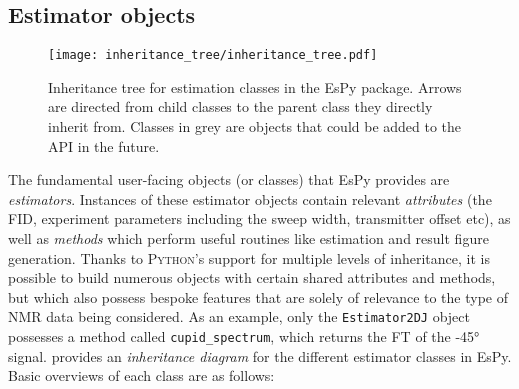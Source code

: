\subsection{Estimator objects}
\begin{figure}
    \centering
    \texttt{[image: inheritance\_tree/inheritance\_tree.pdf]}
    \caption[
        Inheritance tree for estimation classes in the \acs{EsPy} package.
    ]{
        Inheritance tree for estimation classes in the \acs{EsPy} package.
        Arrows are directed from child classes to the parent class they
        directly inherit from. Classes in grey are objects that could be added
        to the \ac{API} in the future.
    }
    \label{fig:inheritance}
\end{figure}
The fundamental user-facing objects (or classes) that \ac{EsPy} provides are
\emph{estimators}.
Instances of these estimator objects contain relevant
\emph{attributes} (the \ac{FID}, experiment parameters including the sweep
width, transmitter offset etc), as well as \emph{methods} which perform useful
routines like estimation and result figure generation.
Thanks to \textsc{Python}'s support for multiple levels of inheritance, it is
possible to build numerous objects with certain shared attributes and methods,
but which also possess bespoke features that are solely of relevance to
the type of \ac{NMR} data being considered. As an example, only the
\texttt{Estimator2DJ} object possesses a method called \texttt{cupid\_spectrum},
which returns the \ac{FT} of the \ang{-45} signal.
 provides an \emph{inheritance
diagram} for the different estimator classes in \ac{EsPy}. Basic overviews of
each class are as follows:

